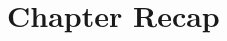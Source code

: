 \documentclass[thesis-solanki.tex]{subfiles}
\begin{document}

\section{Chapter Recap}
\end{document}

